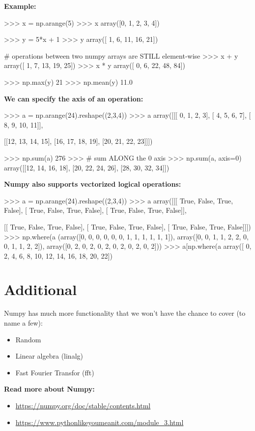 \documentclass[12pt]{article}
\numberwithin{equation}{section}
\begin{document}
\textbf{Example:}
\begin{python}
>>> x = np.arange(5)
>>> x
array([0, 1, 2, 3, 4])

>>> y = 5*x + 1
>>> y
array([ 1,  6, 11, 16, 21])

# operations between two numpy arrays are STILL element-wise
>>> x + y
array([ 1,  7, 13, 19, 25])
>>> x * y
array([ 0,  6, 22, 48, 84])

>>> np.max(y)
21
>>> np.mean(y)
11.0
\end{python}
\textbf{We can specify the axis of an operation:}
\begin{python}
>>> a = np.arange(24).reshape((2,3,4))
>>> a
array([[[ 0,  1,  2,  3],
        [ 4,  5,  6,  7],
        [ 8,  9, 10, 11]],

       [[12, 13, 14, 15],
        [16, 17, 18, 19],
        [20, 21, 22, 23]]])

>>> np.sum(a)
276
>>> # sum ALONG the 0 axis
>>> np.sum(a, axis=0)
array([[12, 14, 16, 18],
       [20, 22, 24, 26],
       [28, 30, 32, 34]])
\end{python}

\textbf{Numpy also supports vectorized logical operations: }
\begin{python}
>>> a = np.arange(24).reshape((2,3,4))
>>> a%
array([[[ True, False,  True, False],
        [ True, False,  True, False],
        [ True, False,  True, False]],

       [[ True, False,  True, False],
        [ True, False,  True, False],
        [ True, False,  True, False]]])
>>> np.where(a%
(array([0, 0, 0, 0, 0, 0, 1, 1, 1, 1, 1, 1]), 
 array([0, 0, 1, 1, 2, 2, 0, 0, 1, 1, 2, 2]), 
 array([0, 2, 0, 2, 0, 2, 0, 2, 0, 2, 0, 2]))
>>> a[np.where(a%
array([ 0,  2,  4,  6,  8, 10, 12, 14, 16, 18, 20, 22])
\end{python}

\section{Additional}
Numpy has much more functionality that we won't have the chance to cover (to name a few):
\begin{itemize}
    \item Random
    \item Linear algebra (linalg)
    \item Fast Fourier Transfor (fft)
\end{itemize}

\textbf{Read more about Numpy:}
\begin{itemize}
    \item \url{https://numpy.org/doc/stable/contents.html}
    \item \url{https://www.pythonlikeyoumeanit.com/module_3.html}
\end{itemize}   
\end{document}
